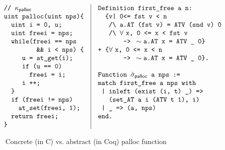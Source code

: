 \begin{figure}[t]\scriptsize
$$
\begin{array}{l|l}
\hspace*{-3ex}
\begin{array}[t]{l}
\verb+// +\kappa_\textsf{palloc}\\
\verb+uint palloc(uint nps){+\\
\verb+  uint i = 0, u;+\\
\verb+  uint freei = nps;+\\
\verb+  while(freei == nps+\\
\verb+         && i < nps) {+\\
\verb+     u = at_get(i);+\\
\verb+     if (u == 0)+\\
\verb+       freei = i;+\\
\verb"     i ++;"\\
\verb+  }+\\
\verb+  if (freei != nps)+\\
\verb+    at_set(freei, 1);+\\
\verb+  return freei;+\\
\verb+}+\\
\end{array}
&
\begin{array}[t]{l}
\verb+Definition first_free a n:+\\
\verb+  {v| 0<= fst v < n+\\
\verb+   /\+\verb+ a.AT (fst v) = ATV (snd v) 0+\\
\verb+   /\+\verb+ +\forall\ \verb+x, 0 <= x < fst v+\\
\verb+       -> +\sim\verb+a.AT x = ATV _ 0}+\\
\verb"+ {"\forall\ \verb+x, 0 <= x < n+\\
\verb+       -> +\sim\verb+a.AT x = ATV _ 0}.+\\
\\
\verb+Function + \hat{\sigma}_\textsf{palloc} \verb+ a nps :=+\\
\verb+match first_free a nps with+\\
\verb+ | inleft (exist (i, t) _) =>+\\
\verb+   (set_AT a i (ATV t 1), i)+\\
\verb+ | _ => (a, nps)+\\
\verb+end.+\\
\end{array}
\end{array}
$$ 
\caption{Concrete (in C) vs. abstract (in Coq) \textsf{palloc} function}
\label{fig:palloc}
\end{figure}

